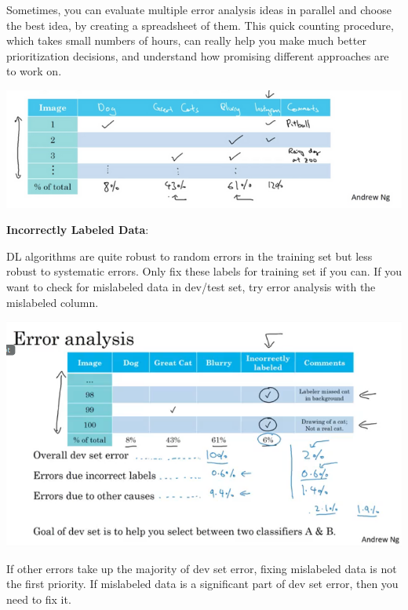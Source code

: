 \documentclass{article}
\begin{document}
\bigskip

\noindent Sometimes, you can evaluate multiple error analysis ideas in parallel and choose the best idea, by creating a spreadsheet of them. This quick counting procedure, which takes small numbers of hours, can really help you make much better prioritization decisions, and understand how promising different approaches are to work on.

\begin{center}
\includegraphics[scale=0.5]{./images/error_analysis.png}
\end{center}

\noindent \textbf{Incorrectly Labeled Data}:

\noindent DL algorithms are quite robust to random errors in the training set but less robust to systematic errors. Only fix these labels for training set if you can. If you want to check for mislabeled data in dev/test set, try error analysis with the mislabeled column.

\begin{center}
\includegraphics[scale=0.4]{./images/incorrectly_labeled_data.png}
\end{center}

\noindent If other errors take up the majority of dev set error, fixing mislabeled data is not the first priority. If mislabeled data is a significant part of dev set error, then you need to fix it.
\end{document}
